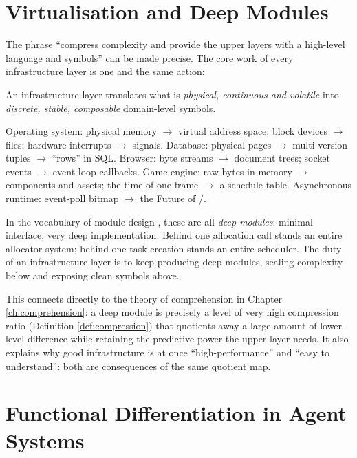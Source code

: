 \section{Virtualisation and Deep Modules}\label{sec:virtualisation}

The phrase ``compress complexity and provide the upper layers with a high-level language and
symbols'' can be made precise. The core work of every infrastructure layer is one and the
same action:

\begin{principle}[Virtualisation]\label{pr:vm}
An infrastructure layer translates what is \emph{physical, continuous and volatile} into
\emph{discrete, stable, composable} domain-level symbols.
\end{principle}

\begin{example}\label{ex:vm}
Operating system: physical memory $\to$ virtual address space; block devices $\to$ files;
hardware interrupts $\to$ signals.
Database: physical pages $\to$ multi-version tuples $\to$ ``rows'' in SQL.
Browser: byte streams $\to$ document trees; socket events $\to$ event-loop callbacks.
Game engine: raw bytes in memory $\to$ components and assets; the time of one frame $\to$ a
schedule table.
Asynchronous runtime: event-poll bitmap $\to$ the Future of /.
\end{example}

In the vocabulary of module design \cite{parnas1972,ousterhout2018}, these are all \emph{deep
modules}: minimal interface, very deep implementation. Behind one allocation call stands an
entire allocator system; behind one task creation stands an entire scheduler. The duty of
an infrastructure layer is to keep producing deep modules, sealing complexity below and
exposing clean symbols above.

This connects directly to the theory of comprehension in Chapter \ref{ch:comprehension}: a
deep module is precisely a level of very high compression ratio
(Definition \ref{def:compression}) that quotients away a large amount of lower-level
difference while retaining the predictive power the upper layer needs. It also explains why
good infrastructure is at once ``high-performance'' and ``easy to understand'': both are
consequences of the same quotient map.

\section{Functional Differentiation in Agent Systems}\label{sec:agent}

